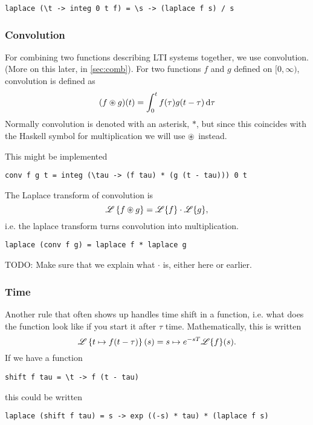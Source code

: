 \begin{verbatim}
laplace (\t -> integ 0 t f) = \s -> (laplace f s) / s 
\end{verbatim}    
\subsubsection{Convolution}\label{sec:convol} 
For combining two functions describing LTI systems together, we use convolution. (More on this later, in \ref{sec:comb}).
For two functions $f$ and $g$ defined on $[0,\infty)$, convolution is defined as
\begin{equation*}
    (f \circledast g)(t) = \int_0^t f(\tau) g(t-\tau) \, \dd\tau 
\end{equation*}
Normally convolution is denoted with an asterisk, $\ast$, but since this coincides with the Haskell symbol for multiplication we will use $\circledast$ instead.

This might be implemented 
\begin{verbatim}
conv f g t = integ (\tau -> (f tau) * (g (t - tau))) 0 t 
\end{verbatim} 

The Laplace transform of convolution is 
\begin{equation*}
    \mathscr{L} \left\{f\circledast g\right\} = \mathscr{L}\{f\} \cdot \mathscr{L}\{g\}, 
\end{equation*}
i.e. the laplace transform turns convolution into multiplication. 
\begin{verbatim}
laplace (conv f g) = laplace f * laplace g 
\end{verbatim} 

TODO: Make sure that we explain what $\cdot$ is, either here or earlier.



\subsubsection{Time} 
 Another rule that often shows up handles time shift in a function, i.e. what does the function look like if you start it after $\tau$ time. Mathematically, this is written
 \begin{equation*}
     \mathscr{L} \left\{ t \mapsto f(t-\tau)\right\}(s) =  s \mapsto e^{-sT} \mathscr{L} \{f\}(s).
 \end{equation*}
If we have a function
\begin{verbatim}
shift f tau = \t -> f (t - tau) 
\end{verbatim} 
this could be written 
\begin{verbatim}
laplace (shift f tau) = s -> exp ((-s) * tau) * (laplace f s)
\end{verbatim} 

